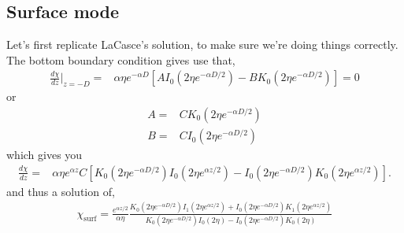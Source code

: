\documentclass[11pt]{article}
\begin{document}
\subsection{Surface mode}
Let's first replicate LaCasce's solution, to make sure we're doing things correctly. The bottom boundary condition gives use that,
\begin{align}
\frac{d\chi}{dz} \biggr\rvert_{z=-D} =&  \alpha   \eta e^{-\alpha D} \left[ A I_0 \left( 2 \eta e^{-\alpha D/2} \right) - B K_0 \left( 2 \eta e^{-\alpha D/2} \right)  \right] = 0
\end{align}
or
\begin{align}
A =& C K_0 \left( 2 \eta e^{-\alpha D/2} \right) \\
B =& C I_0 \left( 2 \eta e^{-\alpha D/2} \right)
\end{align}
which gives you 
\begin{align}
\frac{d\chi}{dz}=& \alpha   \eta e^{\alpha z} C \left[ K_0 \left( 2 \eta e^{-\alpha D/2} \right) I_0 \left( 2 \eta e^{\alpha z/2} \right) - I_0 \left( 2 \eta e^{-\alpha D/2} \right) K_0 \left( 2 \eta e^{\alpha z/2} \right)  \right].
\end{align}
and thus a solution of,
\begin{align}
\chi_{\textrm{surf}} = \frac{e^{\alpha z/2}}{\alpha \eta} \frac{ K_0 \left( 2 \eta e^{-\alpha D/2} \right) I_1 \left( 2 \eta e^{\alpha z/2} \right) + I_0 \left( 2 \eta e^{-\alpha D/2} \right) K_1 \left( 2 \eta e^{\alpha z/2} \right)}{ K_0 \left( 2 \eta e^{-\alpha D/2} \right) I_0 \left( 2 \eta \right) - I_0 \left( 2 \eta e^{-\alpha D/2} \right) K_0 \left( 2 \eta  \right)}
\end{align}
\end{document}
